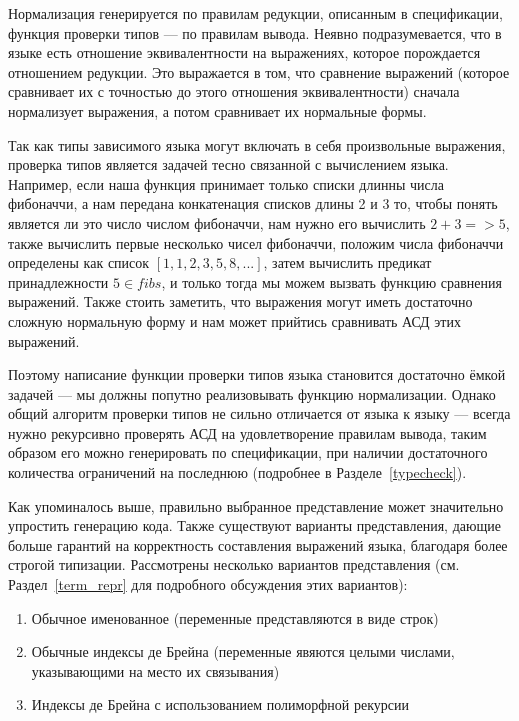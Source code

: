 Нормализация генерируется по правилам редукции, описанным в спецификации, функция проверки типов --- по правилам вывода. Неявно подразумевается, что в языке есть отношение эквивалентности на выражениях, которое порождается отношением редукции. Это выражается в том, что сравнение выражений (которое сравнивает их с точностью до этого отношения эквивалентности) сначала нормализует выражения, а потом сравнивает их нормальные формы.

Так как типы зависимого языка могут включать в себя произвольные выражения, проверка типов является задачей тесно связанной с вычислением языка. Например, если наша функция принимает только списки длинны числа фибоначчи, а нам передана конкатенация списков длины 2 и 3 то, чтобы понять является ли это число числом фибоначчи, нам нужно его вычислить $2 + 3 => 5$, также вычислить первые несколько чисел фибоначчи, положим числа фибоначчи определены как список $[1,1,2,3,5,8,...]$, затем вычислить предикат принадлежности $5 \in fibs$, и только тогда мы можем вызвать функцию сравнения выражений. Также стоить заметить, что выражения могут иметь достаточно сложную нормальную форму и нам может прийтись сравнивать АСД этих выражений.

Поэтому написание функции проверки типов языка становится достаточно ёмкой задачей --- мы должны попутно реализовывать функцию нормализации. Однако общий алгоритм проверки типов не сильно отличается от языка к языку --- всегда нужно рекурсивно проверять АСД на удовлетворение правилам вывода, таким образом его можно генерировать по спецификации, при наличии достаточного количества ограничений на последнюю (подробнее в Разделе~\ref{typecheck}).


Как упоминалось выше, правильно выбранное представление может значительно упростить генерацию кода. Также существуют варианты представления, дающие больше гарантий на корректность составления выражений языка, благодаря более строгой типизации. Рассмотрены несколько вариантов представления (см. Раздел~\ref{term_repr} для подробного обсуждения этих вариантов):
\begin{enumerate}
\item Обычное именованное (переменные представляются в виде строк)
\item Обычные индексы де Брейна\cite{de_brujin} (переменные явяются целыми числами, указывающими на место их связывания)
\item Индексы де Брейна с использованием полиморфной рекурсии\cite{poly_rec}
\end{enumerate}

